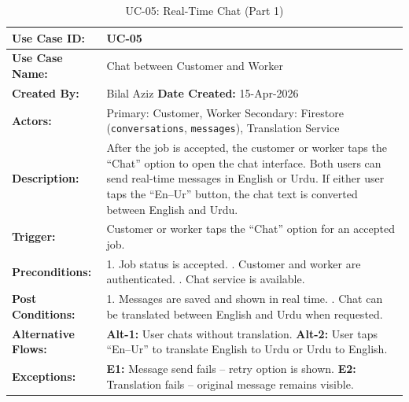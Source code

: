 {\small
\renewcommand{\arraystretch}{1.05}
\begin{table}[H]
\centering
\begin{tabular}{|p{3cm}|p{11.2cm}|}
\hline
\textbf{Use Case ID:} & UC-05 \\ \hline
\textbf{Use Case Name:} & Chat between Customer and Worker \\ \hline
\textbf{Created By:} & Bilal Aziz \hfill \textbf{Date Created:} 15-Apr-2026 \\ \hline
\textbf{Actors:} & Primary: Customer, Worker \quad Secondary: Firestore (\texttt{conversations}, \texttt{messages}), Translation Service \\ \hline
\textbf{Description:} & After the job is accepted, the customer or worker taps the ``Chat'' option to open the chat interface. Both users can send real-time messages in English or Urdu. If either user taps the ``En--Ur'' button, the chat text is converted between English and Urdu. \\ \hline
\textbf{Trigger:} & Customer or worker taps the ``Chat'' option for an accepted job. \\ \hline
\textbf{Preconditions:} & 1. Job status is accepted. \newline 2. Customer and worker are authenticated. \newline 3. Chat service is available. \\ \hline
\textbf{Post Conditions:} & 1. Messages are saved and shown in real time. \newline 2. Chat can be translated between English and Urdu when requested. \\ \hline
\textbf{Alternative Flows:} & \textbf{Alt-1:} User chats without translation. \newline \textbf{Alt-2:} User taps ``En--Ur'' to translate English to Urdu or Urdu to English. \\ \hline
\textbf{Exceptions:} & \textbf{E1:} Message send fails -- retry option is shown. \newline \textbf{E2:} Translation fails -- original message remains visible. \\ \hline
\end{tabular}
\caption*{UC-05: Real-Time Chat (Part 1)}
\end{table}
}

\newpage

